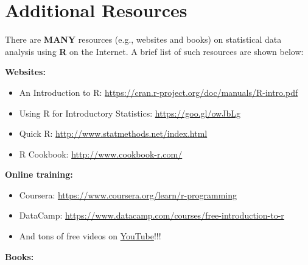 \documentclass[]{book}
\providecommand{\tightlist}{%
  \setlength{\itemsep}{0pt}\setlength{\parskip}{0pt}}
\begin{document}
\hypertarget{additional-resources}{%
\section{Additional Resources}\label{additional-resources}}

There are \textbf{MANY} resources (e.g., websites and books) on statistical data analysis using \textbf{R} on the Internet. A brief list of such resources are shown below:

\textbf{Websites:}

\begin{itemize}
\tightlist
\item
  An Introduction to R: \url{https://cran.r-project.org/doc/manuals/R-intro.pdf}\\
\item
  Using R for Introductory Statistics: \url{https://goo.gl/owJbLg}\\
\item
  Quick R: \url{http://www.statmethods.net/index.html}\\
\item
  R Cookbook: \url{http://www.cookbook-r.com/}
\end{itemize}

\textbf{Online training:}

\begin{itemize}
\tightlist
\item
  Coursera: \url{https://www.coursera.org/learn/r-programming}\\
\item
  DataCamp: \url{https://www.datacamp.com/courses/free-introduction-to-r}\\
\item
  And tons of free videos on \href{https://www.youtube.com/}{YouTube}!!!
\end{itemize}

\textbf{Books:}
\end{document}
